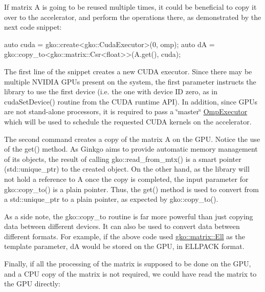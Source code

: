 If matrix A is going to be reused multiple times, it could be beneficial to copy it over to the accelerator, and perform the operations there, as demonstrated by the next code snippet\+:


\begin{DoxyCode}
\textcolor{keyword}{auto} cuda = gko::create<gko::CudaExecutor>(0, omp);
\textcolor{keyword}{auto} dA = gko::copy\_to<gko::matrix::Csr<float>>(A.get(), cuda);
\end{DoxyCode}


The first line of the snippet creates a new C\+U\+DA executor. Since there may be multiple N\+V\+I\+D\+IA G\+P\+Us present on the system, the first parameter instructs the library to use the first device (i.\+e. the one with device ID zero, as in cuda\+Set\+Device() routine from the C\+U\+DA runtime A\+PI). In addition, since G\+P\+Us are not stand-\/alone processors, it is required to pass a \char`\"{}master\char`\"{} \hyperlink{classgko_1_1OmpExecutor}{Omp\+Executor} which will be used to schedule the requested C\+U\+DA kernels on the accelerator.

The second command creates a copy of the matrix A on the G\+PU. Notice the use of the get() method. As Ginkgo aims to provide automatic memory management of its objects, the result of calling gko\+::read\+\_\+from\+\_\+mtx() is a smart pointer (std\+::unique\+\_\+ptr) to the created object. On the other hand, as the library will not hold a reference to A once the copy is completed, the input parameter for gko\+::copy\+\_\+to() is a plain pointer. Thus, the get() method is used to convert from a std\+::unique\+\_\+ptr to a plain pointer, as expected by gko\+::copy\+\_\+to().

As a side note, the gko\+::copy\+\_\+to routine is far more powerful than just copying data between different devices. It can also be used to convert data between different formats. For example, if the above code used \hyperlink{classgko_1_1matrix_1_1Ell}{gko\+::matrix\+::\+Ell} as the template parameter, dA would be stored on the G\+PU, in E\+L\+L\+P\+A\+CK format.

Finally, if all the processing of the matrix is supposed to be done on the G\+PU, and a C\+PU copy of the matrix is not required, we could have read the matrix to the G\+PU directly\+:



